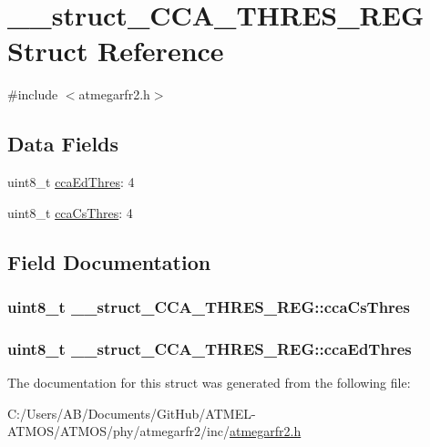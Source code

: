 \hypertarget{struct____struct___c_c_a___t_h_r_e_s___r_e_g}{\section{\-\_\-\-\_\-struct\-\_\-\-C\-C\-A\-\_\-\-T\-H\-R\-E\-S\-\_\-\-R\-E\-G Struct Reference}
\label{struct____struct___c_c_a___t_h_r_e_s___r_e_g}
}


{\ttfamily \#include $<$atmegarfr2.\-h$>$}

\subsection*{Data Fields}
\begin{DoxyCompactItemize}
\item 
uint8\-\_\-t \hyperlink{struct____struct___c_c_a___t_h_r_e_s___r_e_g_a005d8c5436336a565d6f4456d8f66acc}{cca\-Ed\-Thres}\-: 4
\item 
uint8\-\_\-t \hyperlink{struct____struct___c_c_a___t_h_r_e_s___r_e_g_a80bbc8b78a25a7be47c76635bb18ff42}{cca\-Cs\-Thres}\-: 4
\end{DoxyCompactItemize}


\subsection{Field Documentation}
\hypertarget{struct____struct___c_c_a___t_h_r_e_s___r_e_g_a80bbc8b78a25a7be47c76635bb18ff42}{
\subsubsection[{cca\-Cs\-Thres}]{\setlength{\rightskip}{0pt plus 5cm}uint8\-\_\-t \-\_\-\-\_\-struct\-\_\-\-C\-C\-A\-\_\-\-T\-H\-R\-E\-S\-\_\-\-R\-E\-G\-::cca\-Cs\-Thres}}\label{struct____struct___c_c_a___t_h_r_e_s___r_e_g_a80bbc8b78a25a7be47c76635bb18ff42}
\hypertarget{struct____struct___c_c_a___t_h_r_e_s___r_e_g_a005d8c5436336a565d6f4456d8f66acc}{
\subsubsection[{cca\-Ed\-Thres}]{\setlength{\rightskip}{0pt plus 5cm}uint8\-\_\-t \-\_\-\-\_\-struct\-\_\-\-C\-C\-A\-\_\-\-T\-H\-R\-E\-S\-\_\-\-R\-E\-G\-::cca\-Ed\-Thres}}\label{struct____struct___c_c_a___t_h_r_e_s___r_e_g_a005d8c5436336a565d6f4456d8f66acc}


The documentation for this struct was generated from the following file\-:\begin{DoxyCompactItemize}
\item 
C\-:/\-Users/\-A\-B/\-Documents/\-Git\-Hub/\-A\-T\-M\-E\-L-\/\-A\-T\-M\-O\-S/\-A\-T\-M\-O\-S/phy/atmegarfr2/inc/\hyperlink{atmegarfr2_8h}{atmegarfr2.\-h}\end{DoxyCompactItemize}
